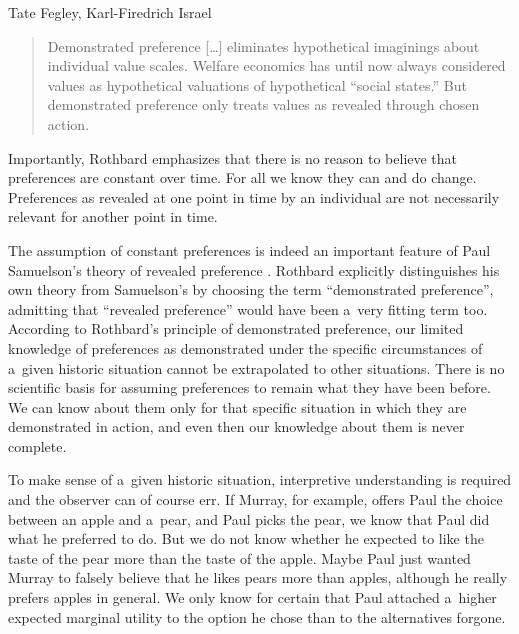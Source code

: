 \begin{artengenv2auth}{Tate Fegley, Karl-Firedrich Israel}
\begin{quote}
Demonstrated preference […] eliminates hypothetical imaginings about individual value scales. Welfare economics has until now always considered values as hypothetical valuations of hypothetical ``social states.'' But demonstrated preference only treats values as revealed through chosen action.
\end{quote}



Importantly, Rothbard emphasizes that there is no reason to believe that preferences are constant over time. For all we know they can and do change. Preferences as revealed at one point in time by an individual are not necessarily relevant for another point in time.



The assumption of constant preferences is indeed an important feature of Paul Samuelson's theory of revealed preference 
\parencite[][]{samuelson_empirical_1938}. %
 Rothbard explicitly distinguishes his own theory from Samuelson's by choosing the term ``demonstrated preference'', admitting that ``revealed preference'' would have been a~very fitting term too. According to Rothbard's principle of demonstrated preference, our limited knowledge of preferences as demonstrated under the specific circumstances of a~given historic situation cannot be extrapolated to other situations. There is no scientific basis for assuming preferences to remain what they have been before. We can know about them only for that specific situation in which they are demonstrated in action, and even then our knowledge about them is never complete.



To make sense of a~given historic situation, interpretive understanding is required and the observer can of course err. If Murray, for example, offers Paul the choice between an apple and a~pear, and Paul picks the pear, we know that Paul did what he preferred to do. But we do not know whether he expected to like the taste of the pear more than the taste of the apple. Maybe Paul just wanted Murray to falsely believe that he likes pears more than apples, although he really prefers apples in general. We only know for certain that Paul attached a~higher expected marginal utility to the option he chose than to the alternatives forgone.




\end{artengenv2auth}
